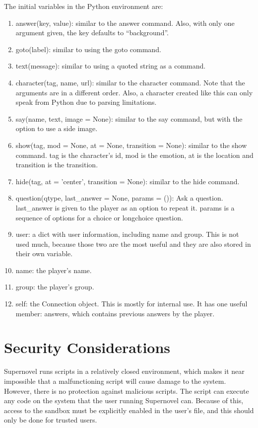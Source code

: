 \documentclass{article}
\begin{document}
The initial variables in the Python environment are:
\begin{enumerate}
	\item answer(key, value): similar to the answer command. Also, with
		only one argument given, the key defaults to ``background''.
	\item goto(label): similar to using the goto command.
	\item text(message): similar to using a quoted string as a command.
	\item character(tag, name, url): similar to the character command. Note
		that the arguments are in a different order. Also, a character
		created like this can only speak from Python due to parsing
		limitations.
	\item say(name, text, image = None): similar to the say command, but
		with the option to use a side image.
	\item show(tag, mod = None, at = None, transition = None): similar to
		the show command. tag is the character's id, mod is the
		emotion, at is the location and transition is the transition.
	\item hide(tag, at = 'center', transition = None): similar to the hide
		command.
	\item question(qtype, last\_answer = None, params = ()): Ask a
		question. last\_answer is given to the player as an option to
		repeat it. params is a sequence of options for a choice or
		longchoice question.
	\item user: a dict with user information, including name and group.
		This is not used much, because those two are the most useful
		and they are also stored in their own variable.
	\item name: the player's name.
	\item group: the player's group.
	\item self: the Connection object. This is mostly for internal use. It
		has one useful member: answers, which contains previous answers
		by the player.
\end{enumerate}

\section{Security Considerations}
Supernovel runs scripts in a relatively closed environment, which makes it near
impossible that a malfunctioning script will cause damage to the system.
However, there is no protection against malicious scripts. The script can
execute any code on the system that the user running Supernovel can. Because of
this, access to the sandbox must be explicitly enabled in the user's file, and
this should only be done for trusted users.
\end{document}
